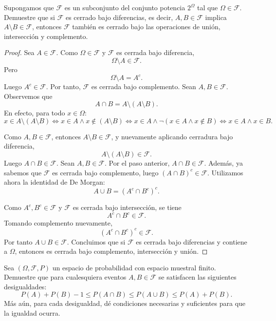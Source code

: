 \documentclass[12pt,a4paper]{article}
\begin{document}
    \begin{mdframed}[style=mdbluebox,frametitle={Ejercicio 7}]
        Supongamos que $\mathcal{F}$ es un subconjunto del conjunto potencia $2^\Omega$ tal que $\Omega \in \mathcal{F}$. Demuestre que si $\mathcal{F}$ es cerrado bajo diferencias, es decir, $A, B \in \mathcal{F}$ implica $A \setminus B \in \mathcal{F}$, entonces $\mathcal{F}$ también es cerrado bajo las operaciones de unión, intersección y complemento.
    \end{mdframed}

    \begin{proof}
        Sea $A\in\mathcal F$. Como $\Omega\in\mathcal F$ y $\mathcal F$
        es cerrada bajo diferencia,
        \[
            \Omega\setminus A \in \mathcal F.
        \]
        Pero
        \[
            \Omega\setminus A = A^c.
        \]
        Luego $A^c\in\mathcal F$.
        Por tanto, $\mathcal F$ es cerrada bajo complemento. Sean $A,B\in\mathcal F$.
        Observemos que
        \[
            A\cap B = A\setminus (A\setminus B).
        \]
        En efecto, para todo $x\in\Omega$:
        \[
            x\in A\setminus (A\setminus B)
            \iff x\in A \land x\notin (A\setminus B)
            \iff x\in A \land \neg(x\in A \land x\notin B)
            \iff x\in A \land x\in B.
        \]
    
        Como $A,B\in\mathcal F$, entonces $A\setminus B\in\mathcal F$,
        y nuevamente aplicando cerradura bajo diferencia,
        \[
            A\setminus (A\setminus B)\in\mathcal F.
        \]
        Luego $A\cap B\in\mathcal F$. Sean $A,B\in\mathcal F$.
        Por el paso anterior, $A\cap B\in\mathcal F$.
        Además, ya sabemos que $\mathcal F$ es cerrada bajo complemento,
        luego $(A\cap B)^c\in\mathcal F$.
        Utilizamos ahora la identidad de De Morgan:
        \[
            A\cup B = (A^c\cap B^c)^c.
        \]
    
        Como $A^c,B^c\in\mathcal F$ y $\mathcal F$ es cerrada
        bajo intersección, se tiene
        \[
            A^c\cap B^c\in\mathcal F.
        \]
        Tomando complemento nuevamente,
        \[
            (A^c\cap B^c)^c\in\mathcal F.
        \]
        Por tanto $A\cup B\in\mathcal F$.  
        Concluimos que si $\mathcal F$ es cerrada bajo diferencias
        y contiene a $\Omega$, entonces es cerrada bajo
        complemento, intersección y unión.
    \end{proof}

    \begin{mdframed}[style=mdbluebox,frametitle={Ejercicio 8}]
        Sea $(\Omega, \mathcal{F}, P)$ un espacio de probabilidad con espacio muestral finito. Demuestre que para cualesquiera eventos $A, B \in \mathcal{F}$ se satisfacen las siguientes desigualdades:
        \begin{equation*}
            P(A) + P(B) - 1 \le P(A \cap B) \le P(A \cup B) \le P(A) + P(B).
        \end{equation*}
        Más aún, para cada desigualdad, dé condiciones necesarias y suficientes para que la igualdad ocurra.
    \end{mdframed}
\end{document}
